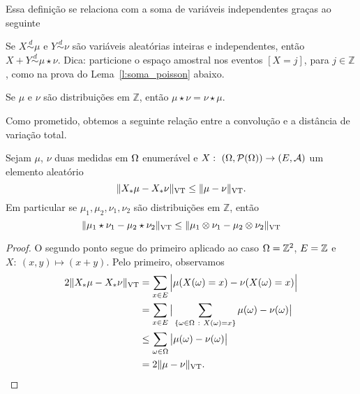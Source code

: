 \begin{topics}
Essa definição se relaciona com a soma de variáveis independentes graças ao seguinte
\begin{exercise}
Se $X \overset{d}\sim \mu$ e $Y \overset{d}\sim \nu$ são variáveis aleatórias inteiras e independentes, então $X + Y \overset{d}\sim \mu \star \nu$.
Dica: particione o espaço amostral nos eventos $[X = j]$, para $j \in \mathbb{Z}$, como na prova do Lema~\ref{l:soma_poisson} abaixo.
\end{exercise}

\begin{corollary}
Se $\mu$ e $\nu$ são distribuições em $\mathbb{Z}$, então $\mu \star \nu = \nu \star \mu$.
\end{corollary}

Como prometido, obtemos a seguinte relação entre a convolução e a distância de  variação total.
\begin{lemma}
\label{l:vt_conv}
Sejam $\mu$, $\nu$ duas medidas em $\Omega$ enumerável e $X:\  (\Omega,{\mathcal P}(\Omega))\to (E,{\mathcal A})$ um elemento aleatório
\begin{equation}
   \lVert X_*\mu - X_*\nu\rVert_{\operatorname{VT}}\le    \lVert \mu - \nu\rVert_{\operatorname{VT}}.
\end{equation}
Em particular se $\mu_1, \mu_2, \nu_1, \nu_2$ são distribuições em $\mathbb{Z}$, então
\begin{equation}
  \lVert \mu_1 \star \nu_1 - \mu_2 \star \nu_2 \rVert_{\operatorname{VT}} \leq \lVert \mu_1 \otimes \nu_1 - \mu_2 \otimes \nu_2 \rVert_{\operatorname{VT}}
\end{equation}
\end{lemma}

\begin{proof}
O segundo ponto segue do primeiro aplicado ao caso $\Omega={\mathbb Z}^2$, $E={\mathbb Z}$ e $X:\ (x,y) \mapsto (x+y)$.
Pelo primeiro, observamos
\begin{equation}
  \begin{split}
    2\lVert X_*\mu - X_*\nu\rVert_{\VT} &= \sum_{x \in E} \Big| \mu(X(\go)=x) - \nu(X(\go)=x) \Big|\\
    & =  \sum_{x \in E} \big| \sum_{\{\go \in\gO \ : \ X(\go)=x\}}  \mu(\go) - \nu(\go) \big|\\
    & \leq \sum_{\go \in \gO} \big| \mu(\go)- \nu(\go) \big|\\
    & = 2\lVert \mu - \nu\rVert_{\VT}.
  \end{split}
\end{equation}

\end{proof}


\end{topics}
